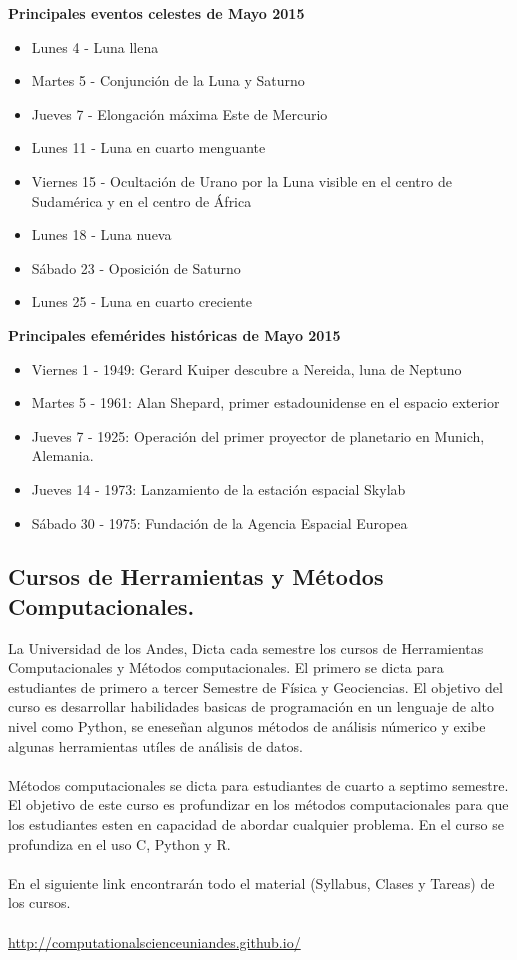 \documentclass{book}
\begin{document}
\textbf{Principales eventos celestes de Mayo 2015}

\begin{itemize}
\item     Lunes 4 - Luna llena
\item     Martes 5 - Conjunción de la Luna y Saturno
 \item    Jueves 7 - Elongación máxima Este de Mercurio
\item     Lunes 11 - Luna en cuarto menguante
\item     Viernes 15 - Ocultación de Urano por la Luna visible en el centro de Sudamérica y en el centro de África
\item     Lunes 18 - Luna nueva
\item     Sábado 23 - Oposición de Saturno
\item     Lunes 25 - Luna en cuarto creciente
\end{itemize}

\textbf{Principales efemérides históricas de Mayo 2015} 

\begin{itemize}
\item     Viernes 1 - 1949: Gerard Kuiper descubre a Nereida, luna de Neptuno
 \item    Martes 5 - 1961: Alan Shepard, primer estadounidense en el espacio exterior
 \item    Jueves 7 - 1925: Operación del primer proyector de planetario en Munich, Alemania.
 \item    Jueves 14 - 1973: Lanzamiento de la estación espacial Skylab
 \item    Sábado 30 - 1975: Fundación de la Agencia Espacial Europea
 \end{itemize}   
 
\subsection{Cursos de Herramientas y Métodos Computacionales.}


La Universidad de los Andes, Dicta cada semestre los cursos de Herramientas
Computacionales y Métodos computacionales. El primero se dicta para estudiantes
de primero a tercer Semestre de Física y Geociencias. El objetivo del curso es desarrollar habilidades basicas de programación en un lenguaje de alto nivel como Python, se eneseñan algunos métodos de análisis númerico y exibe algunas herramientas utíles de análisis de datos.\\
\\
Métodos computacionales se dicta para estudiantes de cuarto a septimo semestre. El objetivo de este curso es profundizar en los métodos computacionales para que los estudiantes esten en capacidad de abordar cualquier problema. En el curso se profundiza en el uso C, Python  y R.\\
\\
En el siguiente link encontrarán todo el material (Syllabus, Clases y Tareas)
de los cursos.\\
\\
\url{http://computationalscienceuniandes.github.io/}
\newpage 
 
\end{document}
